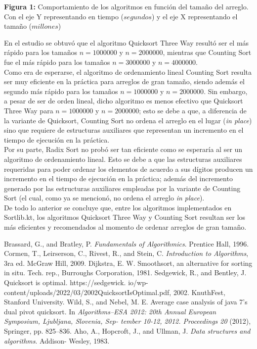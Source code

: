 \documentclass[titlepage]{article}
\begin{document}
        \begin{center}
        	\caption{\textbf{Figura 1:} Comportamiento de los algoritmos en funci\'on del tamaño del arreglo.
         Con el eje Y representando en tiempo ($segundos$) y el eje X representando el tamaño ($millones$) }
        \end{center}
	
	En el estudio se obtuv\'o que el algoritmo Quicksort Three Way result\'o ser el m\'as r\'apido para los tamaños $n = 1000000$ y $n = 2000000$, mientras que Counting Sort fue el m\'as r\'apido para los tamaños $n = 3000000$ y $n = 4000000$.\\
	
	Como era de esperarse, el algoritmo de ordenamiento lineal Counting Sort resulta ser muy eficiente en la pr\'actica para arreglos de gran tamaño, siendo adem\'as el segundo m\'as r\'apido para los tamaños $n = 1000000$ y $n = 2000000$. Sin embargo, a pesar de ser de orden lineal, dicho algoritmo es menos efectivo que Quicksort Three Way para $n = 1000000$ y $n = 2000000$; esto se debe a que, a diferencia de la variante de Quicksort, Counting Sort no ordena el arreglo en el lugar (\textit{in place}) sino que requiere de estructuras auxiliares que representan un incremento en el tiempo de ejecuci\'on en la pr\'actica.\\
	
	Por su parte, Radix Sort no prob\'o ser tan eficiente como se esperar\'ia al ser un algoritmo de ordenamiento lineal. Esto se debe a que las estructuras auxiliares requeridas para poder ordenar los elementos de acuerdo a sus d\'igitos producen un incremento en el tiempo de ejecuci\'on en la pr\'actica; adem\'as del incremento generado por las estructuras auxiliares empleadas por la variante de Counting Sort (el cual, como ya se mencion\'o, no ordena el arreglo \textit{in place}).\\
	
	De todo lo anterior se concluye que, entre los algoritmos implementados en Sortlib.kt, los algoritmos Quicksort Three Way y Counting Sort resultan ser los m\'as eficientes y recomendados al momento de ordenar arreglos de gran tamaño. 
	
	\begin{thebibliography}{}
		 Brassard, G., and Bratley, P. \textit{Fundamentals of Algorithmics}. Prentice Hall, 1996.
		 Cormen, T., Leirserson, C., Rivest, R., and Stein, C. \textit{Introduction to Algorithms}, 3ra ed. McGraw Hill, 2009.
		 Dijkstra, E. W. Smoothsort, an alternative for sorting in situ. Tech. rep., Burroughs
		Corporation, 1981.
		 Sedgewick, R., and Bentley, J. Quicksort is optimal. https://sedgewick.
		io/wp-content/uploads/2022/03/2002QuicksortIsOptimal.pdf, 2002. KnuthFest,
		Stanford University.
		 Wild, S., and Nebel, M. E. Average case analysis of java 7’s dual pivot quicksort.
		In \textit{Algorithms–ESA 2012: 20th Annual European Symposium, Ljubljana, Slovenia, Sep-
		tember 10-12, 2012. Proceedings 20} (2012), Springer, pp. 825–836.
		 Aho, A., Hopcroft, J., and Ullman, J. \textit{Data structures and algorithms}. Addison-
		Wesley, 1983.
	\end{thebibliography}
	
\end{document}
